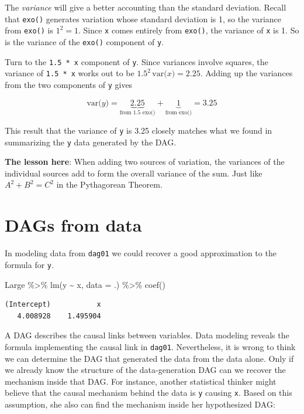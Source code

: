 \documentclass[
  letterpaper,
  DIV=11,
  numbers=noendperiod,
  oneside]{scrreprt}
\newenvironment{Shaded}{\begin{snugshade}}{\end{snugshade}}
\newcommand{\AttributeTok}[1]{\textcolor[rgb]{0.40,0.45,0.13}{#1}}
\newcommand{\FunctionTok}[1]{\textcolor[rgb]{0.28,0.35,0.67}{#1}}
\newcommand{\NormalTok}[1]{\textcolor[rgb]{0.00,0.23,0.31}{#1}}
\newcommand{\SpecialCharTok}[1]{\textcolor[rgb]{0.37,0.37,0.37}{#1}}
\begin{document}
The \emph{variance} will give a better accounting than the standard
deviation. Recall that \texttt{exo()} generates variation whose standard
deviation is 1, so the variance from \texttt{exo()} is \(1^2 = 1\).
Since \texttt{x} comes entirely from \texttt{exo()}, the variance of
\texttt{x} is 1. So is the variance of the \texttt{exo()} component of
\texttt{y}.

Turn to the \texttt{1.5\ *\ x} component of \texttt{y}. Since variances
involve squares, the variance of \texttt{1.5\ *\ x} works out to be
\(1.5^2\, \text{var(}\mathit{x}\text{)} = 2.25\). Adding up the
variances from the two components of \texttt{y} gives

\[\text{var(}\mathit{y}\text{)} = \underbrace{2.25}_\text{from 1.5 exo()} + \underbrace{1}_\text{from exo()} = 3.25\]

This result that the variance of \texttt{y} is 3.25 closely matches what
we found in summarizing the \texttt{y} data generated by the DAG.

\textbf{The lesson here}: When adding two sources of variation, the
variances of the individual sources add to form the overall variance of
the sum. Just like \(A^2 + B^2 = C^2\) in the Pythagorean Theorem.

\hypertarget{dags-from-data}{%
\section{DAGs from data}\label{dags-from-data}}

In modeling data from \texttt{dag01} we could recover a good
approximation to the formula for \texttt{y}.

\begin{Shaded}
\begin{Highlighting}[]
\NormalTok{Large }\SpecialCharTok{\%\textgreater{}\%}
  \FunctionTok{lm}\NormalTok{(y }\SpecialCharTok{\textasciitilde{}}\NormalTok{ x, }\AttributeTok{data =}\NormalTok{ .) }\SpecialCharTok{\%\textgreater{}\%}
  \FunctionTok{coef}\NormalTok{()}
\end{Highlighting}
\end{Shaded}

\begin{verbatim}
(Intercept)           x 
   4.008928    1.495904 
\end{verbatim}

A DAG describes the causal links between variables. Data modeling
reveals the formula implementing the causal link in \texttt{dag01}.
Nevertheless, it is wrong to think we can determine the DAG that
generated the data from the data alone. Only if we already know the
structure of the data-generation DAG can we recover the mechanism inside
that DAG. For instance, another statistical thinker might believe that
the causal mechanism behind the data is \texttt{y} causing \texttt{x}.
Based on this assumption, she also can find the mechanism inside her
hypothesized DAG:
\end{document}

